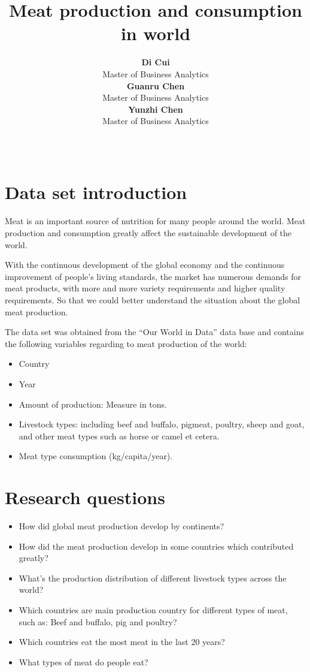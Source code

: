\documentclass[11pt,a4paper,]{article}
\title{Meat production and consumption in world}
\author{\sf\Large\textbf{ Di Cui}\\ {\sf\large Master of Business Analytics\\[0.5cm]} \sf\Large\textbf{ Guanru Chen}\\ {\sf\large Master of Business Analytics\\[0.5cm]} \sf\Large\textbf{ Yunzhi Chen}\\ {\sf\large Master of Business Analytics\\[0.5cm]}}
\date{\sf\Date~\Month~\Year}
\makeatletter
\providecommand{\tightlist}{%
  \setlength{\itemsep}{0pt}\setlength{\parskip}{0pt}}
\def\titlepage{\front{\expandafter{\@title}}{\@author}{\@organization}}
\makeatother
\begin{document}
\titlepage

\hypertarget{data-set-introduction}{%
\section{Data set introduction}\label{data-set-introduction}}

Meat is an important source of nutrition for many people around the world. Meat production and consumption greatly affect the sustainable development of the world.

With the continuous development of the global economy and the continuous improvement of people's living standards, the market has numerous demands for meat products, with more and more variety requirements and higher quality requirements. So that we could better understand the situation about the global meat production.

The data set was obtained from the ``Our World in Data'' data base and contains the following variables regarding to meat production of the world:

\begin{itemize}
\tightlist
\item
  Country
\item
  Year
\item
  Amount of production: Measure in tons.
\item
  Livestock types: including beef and buffalo, pigmeat, poultry, sheep and goat, and other meat types such as horse or camel et cetera.
\item
  Meat type consumption (kg/capita/year).
\end{itemize}

\hypertarget{research-questions}{%
\section{Research questions}\label{research-questions}}

\begin{itemize}
\tightlist
\item
  How did global meat production develop by continents?
\item
  How did the meat production develop in some countries which contributed greatly?
\item
  What's the production distribution of different livestock types across the world?
\item
  Which countries are main production country for different types of meat, such as: Beef and buffalo, pig and poultry?
\item
  Which countries eat the most meat in the last 20 years?
\item
  What types of meat do people eat?
\end{itemize}
\end{document}

